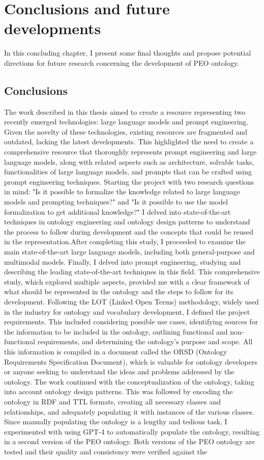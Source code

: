 \chapter{Conclusions and future developments}
In this concluding chapter, I present some final thoughts and propose potential directions for future research concerning the development of PEO ontology.


\section{Conclusions}
The work described in this thesis aimed to create a resource representing two recently emerged technologies: large language models and prompt engineering. Given the novelty of these technologies, existing resources are fragmented and outdated, lacking the latest developments. This highlighted the need to create a comprehensive resource that thoroughly represents prompt engineering and large language models, along with related aspects such as architecture, solvable tasks, functionalities of large language models, and prompts that can be crafted using prompt engineering techniques. Starting the project with two research questions in mind: "Is it possible to formalize the knowledge related to large language models and prompting techniques?" and "Is it possible to use the model formalization to get additional knowledge?" I delved into state-of-the-art techniques in ontology engineering and ontology design patterns to understand the process to follow during development and the concepts that could be reused in the representation.After completing this study, I proceeded to examine the main state-of-the-art large language models, including both general-purpose and multimodal models. Finally, I delved into prompt engineering, studying and describing the leading state-of-the-art techniques in this field. This comprehensive study, which explored multiple aspects, provided me with a clear framework of what should be represented in the ontology and the steps to follow for its development. Following the LOT (Linked Open Terms) methodology, widely used in the industry for ontology and vocabulary development, I defined the project requirements. This included considering possible use cases, identifying sources for the information to be included in the ontology, outlining functional and non-functional requirements, and determining the ontology's purpose and scope. All this information is compiled in a document called the ORSD (Ontology Requirements Specification Document), which is valuable for ontology developers or anyone seeking to understand the ideas and problems addressed by the ontology. The work continued with the conceptualization of the ontology, taking into account ontology design patterns. This was followed by encoding the ontology in RDF and TTL formats, creating all necessary classes and relationships, and adequately populating it with instances of the various classes. Since manually populating the ontology is a lengthy and tedious task, I experimented with using GPT-4 to automatically populate the ontology, resulting in a second version of the PEO ontology. Both versions of the PEO ontology are tested and their quality and consistency were verified against the 
